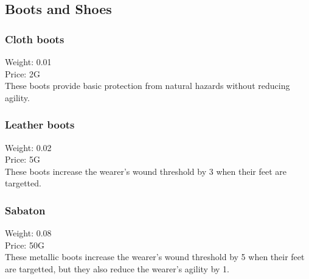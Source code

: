 \subsection{Boots and Shoes}

\subsubsection{Cloth boots}
Weight: 0.01\\
Price: 2G\\
These boots provide basic protection from natural hazards without reducing agility.

\subsubsection{Leather boots}
Weight: 0.02\\
Price: 5G\\
These boots increase the wearer's wound threshold by 3 when their feet are targetted.

\subsubsection{Sabaton}
Weight: 0.08\\
Price: 50G\\
These metallic boots increase the wearer's wound threshold by 5 when their feet are targetted, but they also reduce the wearer's agility by 1.